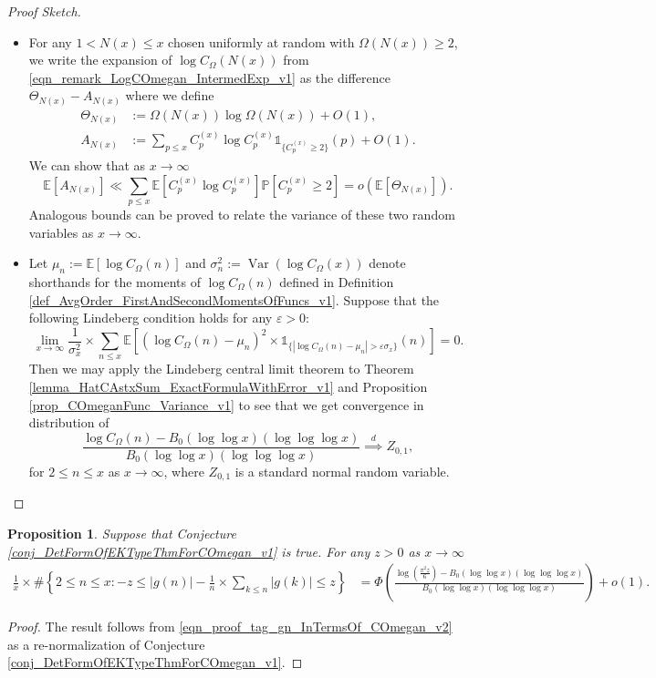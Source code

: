 \documentclass[11pt,reqno,a4letter]{article}
\newcommand{\hlocalref}[1]{\hyperref[#1]{\ref{#1}}}
\numberwithin{equation}{section}
\numberwithin{figure}{section}
\numberwithin{table}{section}
\theoremstyle{plain}
\newtheorem{prop}[theorem]{Proposition}
\numberwithin{theorem}{section}
\theoremstyle{definition}
\begin{document}
\begin{proof}[Proof Sketch]
\begin{itemize}[noitemsep,topsep=0pt,leftmargin=0.23in]
\item 
For any $1 < N(x) \leq x$ chosen uniformly at random with $\Omega(N(x)) \geq 2$, 
we write the expansion of $\log C_{\Omega}(N(x))$ from 
\eqref{eqn_remark_LogCOmegan_IntermedExp_v1} as the difference 
$\Theta_{N(x)} - A_{N(x)}$ where we define 
\begin{align*}
\Theta_{N(x)} & := \Omega(N(x)) \log \Omega(N(x)) + O(1), \\ 
A_{N(x)} & := \sum_{p \leq x} C_p^{(x)} \log C_p^{(x)} \mathds{1}_{\{C_p^{(x)} \geq 2\}}(p) + O(1). 
\end{align*}
We can show that as $x \rightarrow \infty$ 
\[
\mathbb{E}[A_{N(x)}] \ll \sum_{p \leq x} \mathbb{E}\left[C_p^{(x)} \log C_p^{(x)}\right] 
     \mathbb{P}\left[C_p^{(x)} \geq 2\right] = o\left(\mathbb{E}[\Theta_{N(x)}]\right). 
\]
Analogous bounds can be proved to relate the variance of these 
two random variables as $x \rightarrow \infty$. 
\item 
Let $\mu_n := \mathbb{E}\left[\log C_{\Omega}(n)\right]$ and 
$\sigma_n^2 := \operatorname{Var}\left(\log C_{\Omega}(x)\right)$ denote 
shorthands for the moments of $\log C_{\Omega}(n)$ defined in 
Definition \hlocalref{def_AvgOrder_FirstAndSecondMomentsOfFuncs_v1}. 
Suppose that the following Lindeberg condition holds for any 
$\varepsilon > 0$: 
\[
\lim_{x \rightarrow \infty} \frac{1}{\sigma_x^2} \times 
     \sum_{n \leq x} \mathbb{E}\left[\left(\log C_{\Omega}(n) - \mu_n\right)^2 
     \times 
     \mathds{1}_{\{\left\lvert \log C_{\Omega}(n) - \mu_n \right\rvert > 
     \varepsilon \sigma_x\}}(n)\right] = 0. 
\]
Then we may apply the Lindeberg central limit theorem to 
Theorem \hlocalref{lemma_HatCAstxSum_ExactFormulaWithError_v1} and 
Proposition \hlocalref{prop_COmeganFunc_Variance_v1} to see that we get 
convergence in distribution of \cite[\S 27]{BILLINGSLY-PROB-AND-MEASURE-BOOK} 
$$\frac{\log C_{\Omega}(n) - B_0 (\log\log x)(\log\log\log x)}{B_0 (\log\log x)(\log\log\log x)} \overset{d}{\implies} Z_{0,1},$$ 
for $2 \leq n \leq x$ as $x \rightarrow \infty$, 
where $Z_{0,1}$ is a standard normal random variable. 
\qedhere
\end{itemize}
\end{proof}

\begin{prop}
\label{cor_CLT_VII} 
Suppose that Conjecture \hlocalref{conj_DetFormOfEKTypeThmForCOmegan_v1} is true. 
For any $z > 0$ as $x \rightarrow \infty$ 
\begin{align*} 
\frac{1}{x} \times \#\left\{2 \leq n \leq x: -z \leq |g(n)| - 
     \frac{1}{n} \times \sum_{k \leq n} |g(k)| \leq z\right\} & = 
	\Phi\left(\frac{\log\left(\frac{\pi^2 z}{6}\right) - B_0 (\log\log x) (\log\log\log x)}{ 
	B_0 (\log\log x)(\log\log\log x)}\right) + o(1).
\end{align*} 
\end{prop} 
\begin{proof} 
The result follows from \eqref{eqn_proof_tag_gn_InTermsOf_COmegan_v2} 
as a re-normalization of Conjecture \hlocalref{conj_DetFormOfEKTypeThmForCOmegan_v1}. 
\end{proof} 
\end{document}

